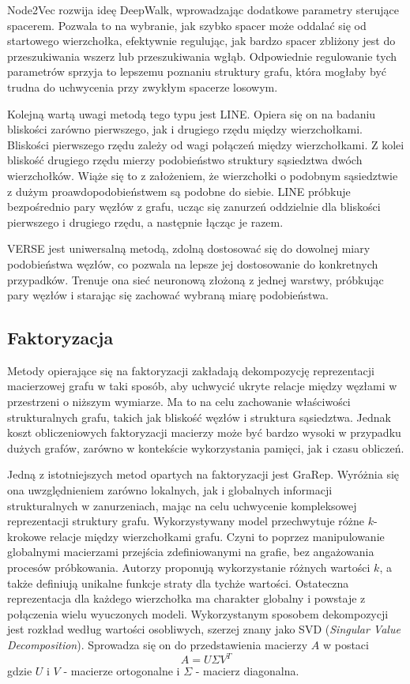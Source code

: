         Node2Vec\cite{Grover_Leskovec_2016} rozwija ideę DeepWalk, wprowadzając dodatkowe parametry sterujące spacerem. Pozwala to na wybranie, jak szybko spacer może oddalać się od startowego wierzchołka, efektywnie regulując, jak bardzo spacer zbliżony jest do przeszukiwania wszerz lub przeszukiwania wgłąb. Odpowiednie regulowanie tych parametrów sprzyja to lepszemu poznaniu struktury grafu, która mogłaby być trudna do uchwycenia przy zwykłym spacerze losowym. 
        
        Kolejną wartą uwagi metodą tego typu jest LINE\cite{Tang_Qu_Wang_Zhang_Yan_Mei_2015}. Opiera się on na badaniu bliskości zarówno pierwszego, jak i drugiego rzędu między wierzchołkami. Bliskości pierwszego rzędu zależy od wagi połączeń między wierzchołkami. Z kolei bliskość drugiego rzędu mierzy podobieństwo struktury sąsiedztwa dwóch wierzchołków. Wiąże się to z założeniem, że wierzchołki o podobnym sąsiedztwie z dużym proawdopodobieństwem są podobne do siebie. LINE próbkuje bezpośrednio pary węzłów z grafu, ucząc się zanurzeń oddzielnie dla bliskości pierwszego i drugiego rzędu, a następnie łącząc je razem. 
        
        VERSE\cite{Tsitsulin_Mottin_Karras_Müller_2018} jest uniwersalną metodą, zdolną dostosować się do dowolnej miary podobieństwa węzłów, co pozwala na lepsze jej dostosowanie do konkretnych przypadków. Trenuje ona sieć neuronową złożoną z jednej warstwy, próbkując pary węzłów i starając się zachować wybraną miarę podobieństwa.

    \subsection{Faktoryzacja}
        Metody opierające się na faktoryzacji zakładają dekompozycję reprezentacji macierzowej grafu w taki sposób, aby uchwycić ukryte relacje między węzłami w przestrzeni o niższym wymiarze. Ma to na celu zachowanie właściwości strukturalnych grafu, takich jak bliskość węzłów i struktura sąsiedztwa. Jednak koszt obliczeniowych faktoryzacji macierzy może być bardzo wysoki w przypadku dużych grafów, zarówno w kontekście wykorzystania pamięci, jak i czasu obliczeń.

        Jedną z istotniejszych metod opartych na faktoryzacji jest GraRep\cite{Cao_Lu_Xu_2015}. Wyróżnia się ona uwzględnieniem zarówno lokalnych, jak i globalnych informacji strukturalnych w zanurzeniach, mając na celu uchwycenie kompleksowej reprezentacji struktury grafu. Wykorzystywany model przechwytuje różne $k$-krokowe relacje między wierzchołkami grafu. Czyni to poprzez manipulowanie globalnymi macierzami przejścia zdefiniowanymi na grafie, bez angażowania procesów próbkowania. Autorzy proponują wykorzystanie różnych wartości $k$, a także definiują unikalne funkcje straty dla tychże wartości. Ostateczna reprezentacja dla każdego wierzchołka ma charakter globalny i powstaje z połączenia wielu wyuczonych modeli. Wykorzystanym sposobem dekompozycji jest rozkład według wartości osobliwych, szerzej znany jako SVD (\emph{Singular Value Decomposition}). Sprowadza się on do przedstawienia macierzy $A$ w postaci 
        \[
            A = U \Sigma V^T  
        \]
        gdzie $U$ i $V$ - macierze ortogonalne i $\Sigma$ - macierz diagonalna.
         
